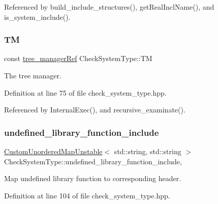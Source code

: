 Referenced by build\+\_\+include\+\_\+structures(), get\+Real\+Incl\+Name(), and is\+\_\+system\+\_\+include().

\mbox{\label{classCheckSystemType_ad55a0baa8f72589feb542a61c64d6a42}} 
\subsubsection{\texorpdfstring{TM}{TM}}
{\footnotesize\ttfamily const \hyperlink{tree__manager_8hpp_a96ff150c071ce11a9a7a1e40590f205e}{tree\+\_\+manager\+Ref} Check\+System\+Type\+::\+TM\hspace{0.3cm}{\ttfamily [private]}}



The tree manager. 



Definition at line 75 of file check\+\_\+system\+\_\+type.\+hpp.



Referenced by Internal\+Exec(), and recursive\+\_\+examinate().

\mbox{\label{classCheckSystemType_aac63e0fa17f7acc5d7fd9215c5d19e87}} 
\subsubsection{\texorpdfstring{undefined\+\_\+library\+\_\+function\+\_\+include}{undefined\_library\_function\_include}}
{\footnotesize\ttfamily \hyperlink{custom__map_8hpp_a8cbaceffc09790a885ec7e9c17809c69}{Custom\+Unordered\+Map\+Unstable}$<$ std\+::string, std\+::string $>$ Check\+System\+Type\+::undefined\+\_\+library\+\_\+function\+\_\+include\hspace{0.3cm}{\ttfamily [static]}, {\ttfamily [private]}}



Map undefined library function to corresponding header. 



Definition at line 104 of file check\+\_\+system\+\_\+type.\+hpp.



